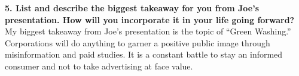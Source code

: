 \documentclass[12pt]{article}
\begin{document}
 \textbf{5. List and describe the biggest takeaway for you from Joe's presentation.  How will you incorporate it in your life going forward?}\\
 
 My biggest takeaway from Joe's presentation is the topic of ``Green Washing.'' Corporations will do anything to garner a positive public image through misinformation and paid studies. It is a constant battle to stay an informed consumer and not to take advertising at face value. 

\newpage
\printbibliography
\end{document}
